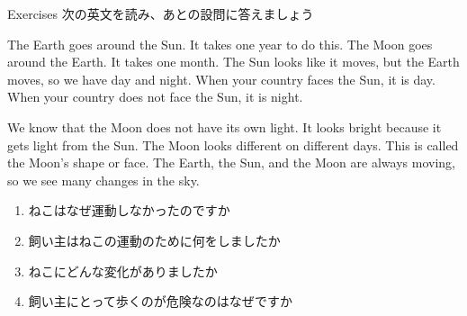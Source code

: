 \documentclass[aspectratio=169,xcolor={dvipsnames,table}]{beamer}
\begin{document}
\begin{frame}[plain]{Exercises}
 \scriptsize
次の英文を読み、あとの設問に答えましょう\mbox{}\hfill{\scriptsize {}}

\vspace{-3pt}
\small
\begin{tcolorbox}[colframe=ForestGreen,
  colback=ForestGreen!10!white,
  colbacktitle=ForestGreen!40!white,
  coltitle=black, %
before upper={\setlength{\parindent}{1.5em}},
  title={The Earth, the Sun, and the Moon}]
The Earth goes around the Sun. It takes one year to do this. The Moon goes around the Earth. It takes one month. The Sun looks like it moves, but the Earth moves, so we have day and night. When your country faces the Sun, it is day. When your country does not face the Sun, it is night.

We know that the Moon does not have its own light. It looks bright because it gets light from the Sun. The Moon looks different on different days. This is called the Moon’s shape or face. The Earth, the Sun, and the Moon are always moving, so we see many changes in the sky.
\end{tcolorbox}

\vspace{-3pt}

\begin{enumerate}\scriptsize\setlength{\itemsep}{-2pt}
 \item<2-> ねこはなぜ運動しなかったのですか\hfill{}
 \item<2-> 飼い主はねこの運動のために何をしましたか\hfill{}
 \item<2-> ねこにどんな変化がありましたか\hfill{}
 \item<2-> 飼い主にとって歩くのが危険なのはなぜですか\hfill{}
\end{enumerate}

\vspace{-15pt}


\end{frame}
\end{document}
